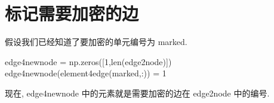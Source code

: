 \documentclass{article}
\begin{document}
\section{标记需要加密的边}
假设我们已经知道了要加密的单元编号为 marked.
\begin{listing}[H]
    \begin{pythoncode}
        edge4newnode = np.zeros([1,len(edge2node)])
        edge4newnode(element4edge(marked,:)) = 1
    \end{pythoncode}
\end{listing}
现在, edge4newnode 中的元素就是需要加密的边在 edge2node 中的编号.

































\cite{knupp2012introducing}


\end{document}
